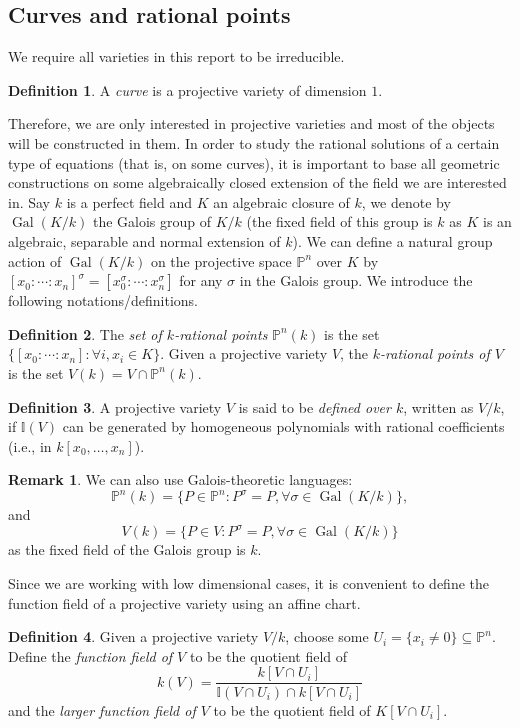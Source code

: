 \documentclass[12pt]{article}
\theoremstyle{remark}
\theoremstyle{definition}
\newtheorem{remark}{Remark}[subsection]
\newtheorem{definition}{Definition}[subsection]
\newcommand{\s}[0]{\sigma}
\newcommand{\Gal}[0]{\operatorname{Gal}}
\begin{document}
	\subsection{Curves and rational points}\label{sec-rat}
        We require all varieties in this report to be irreducible.
        \begin{definition}\label{def-curve}
            A \textit{curve} is a projective variety of dimension $1$.
        \end{definition}
        \noindent Therefore, we are only interested in projective varieties and most of the objects will be constructed in them. In order to study the rational solutions of a certain type of equations (that is, on some curves), it is important to base all geometric constructions on some algebraically closed extension of the field we are interested in. Say $k$ is a perfect field and $K$ an algebraic closure of $k$, we denote by $\Gal(K/k)$ the Galois group of $K/k$ (the fixed field of this group is $k$ as $K$ is an algebraic, separable and normal extension of $k$). We can define a natural group action of $\Gal(K/k)$ on the projective space $\mathbb P^n$ over $K$ by $[x_0:\cdots: x_n]^\sigma =[x_0^\sigma:\cdots: x_n^\sigma]$ for any $\sigma$ in the Galois group. We introduce the following notations/definitions.
        \begin{definition}
            The \textit{set of $k$-rational points} $\mathbb P^n(k)$ is the set $\{[x_0:\cdots:x_n]: \forall i, x_i\in K\}$. Given a projective variety $V$, the \textit{$k$-rational points of $V$} is the set $V(k)=V\cap \mathbb P^n(k)$.
        \end{definition}
        \begin{definition}
            A projective variety $V$ is said to be \textit{defined over $k$}, written as $V/k$, if $\mathbb I(V)$ can be generated by homogeneous polynomials with rational coefficients (i.e., in $k[x_0,\dots, x_n]$).
        \end{definition}
        \begin{remark}
            We can also use Galois-theoretic languages:
            \[\mathbb P^n(k)=\{P\in \mathbb P^n:P^\s = P,\forall\s \in\Gal(K/k)\},\]
            and
            \[V(k)=\{P\in V:P^\s = P,\forall\s \in\Gal(K/k)\}\]
            as the fixed field of the Galois group is $k$.
        \end{remark}
        Since we are working with low dimensional cases, it is convenient to define the function field of a projective variety using an affine chart.
        \begin{definition}
            Given a projective variety $V/k$, choose some $U_i=\{x_i\neq 0\}\subseteq \mathbb P^n$. Define the \textit{function field of $V$} to be the quotient field of
            \[k(V)=\frac{k[V\cap U_i]}{\mathbb I(V\cap U_i)\cap k[V\cap U_i]}\]
            and the \textit{larger function field of $V$} to be the quotient field of $K[V\cap U_i]$.
        \end{definition}
\end{document}
